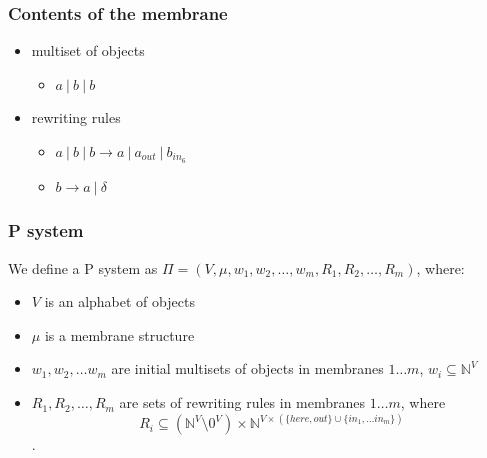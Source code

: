     \begin{frame}[t]\frametitle{Contents of the membrane}
      \begin{itemize}
        \item multiset of objects
        \begin{itemize}
          \item $a\ |\ b\ |\ b$
        \end{itemize}
        \item rewriting rules
        \begin{itemize}
          \item $a\ |\ b\ |\ b\rightarrow a\ |\ a_{out}\ |\ b_{in_{6}}$
          \item $b \rightarrow a\ |\ \delta$
        \end{itemize}
      \end{itemize}
    \end{frame}
    \note{}

    \begin{frame}[t]\frametitle{P system}

      We define a P system as $\Pi = (V, \mu, w_1, w_2,\dots , w_m, R_1, R_2, \dots , R_m)$, where:
      \begin{itemize}
        \item $V$ is an alphabet of objects
        \item $\mu$ is a membrane structure
        \item $w_1, w_2, \dots w_m$ are initial multisets of objects in membranes $1\dots m$, $w_i\subseteq \mathbb{N}^V$
        \item $R_1, R_2, \dots , R_m$ are sets of rewriting rules in membranes $1\dots m$, where $$R_i\subseteq(\mathbb{N}^V\setminus 0^V)\times\mathbb{N}^{V\times(\{here,out\}\cup\{in_1,\dots in_m\})}$$.
      \end{itemize}

    \end{frame}
    \note{}

